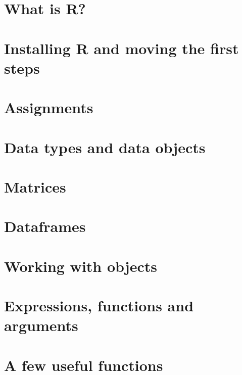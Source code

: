 \documentclass[a4paper,12pt,oneside]{book}
\begin{document}
\hypertarget{what-is-r}{%
\section{What is R?}\label{what-is-r}}

\hypertarget{installing-r-and-moving-the-first-steps}{%
\section{Installing R and moving the first steps}\label{installing-r-and-moving-the-first-steps}}

\hypertarget{assignments}{%
\section{Assignments}\label{assignments}}

\hypertarget{data-types-and-data-objects}{%
\section{Data types and data objects}\label{data-types-and-data-objects}}

\hypertarget{matrices}{%
\section{Matrices}\label{matrices}}

\hypertarget{dataframes}{%
\section{Dataframes}\label{dataframes}}

\hypertarget{working-with-objects}{%
\section{Working with objects}\label{working-with-objects}}

\hypertarget{expressions-functions-and-arguments}{%
\section{Expressions, functions and arguments}\label{expressions-functions-and-arguments}}

\hypertarget{a-few-useful-functions}{%
\section{A few useful functions}\label{a-few-useful-functions}}
\end{document}
